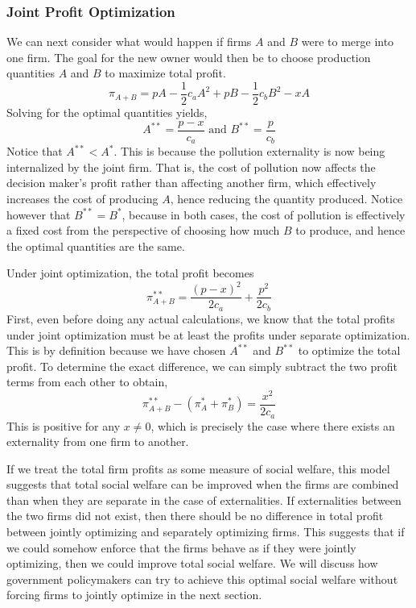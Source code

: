 \subsubsection*{Joint Profit Optimization}
We can next consider what would happen if firms $A$ and $B$ were to merge into one firm. The goal for the new owner would then be to choose production quantities $A$ and $B$ to maximize total profit.
\begin{equation*}
    \pi_{A + B} = pA - \frac{1}{2} c_a A^2 + pB - \frac{1}{2} c_b B^2 - xA
\end{equation*}
Solving for the optimal quantities yields,
\begin{equation*}
    A^{**} = \frac{p - x}{c_a} \text{ and } B^{**} = \frac{p}{c_b}
\end{equation*}
Notice that $A^{**} < A^*$. This is because the pollution externality is now being internalized by the joint firm. That is, the cost of pollution now affects the decision maker's profit rather than affecting another firm, which effectively increases the cost of producing $A$, hence reducing the quantity produced. Notice however that $B^{**} = B^*$, because in both cases, the cost of pollution is effectively a fixed cost from the perspective of choosing how much $B$ to produce, and hence the optimal quantities are the same. 

Under joint optimization, the total profit becomes
\begin{equation*}
    \pi_{A + B}^{**} = \frac{(p - x)^2}{2 c_a} + \frac{p^2}{2 c_b}
\end{equation*}
First, even before doing any actual calculations, we know that the total profits under joint optimization must be at least the profits under separate optimization. This is by definition because we have chosen $A^{**}$ and $B^{**}$ to optimize the total profit. To determine the exact difference, we can simply subtract the two profit terms from each other to obtain,
\begin{equation*}
    \pi_{A + B}^{**} - (\pi_A^* + \pi_B^*) = \frac{x^2}{2c_a}
\end{equation*}
This is positive for any $x \neq 0$, which is precisely the case where there exists an externality from one firm to another. 

If we treat the total firm profits as some measure of social welfare, this model suggests that total social welfare can be improved when the firms are combined than when they are separate in the case of externalities. If externalities between the two firms did not exist, then there should be no difference in total profit between jointly optimizing and separately optimizing firms. This suggests that if we could somehow enforce that the firms behave as if they were jointly optimizing, then we could improve total social welfare. We will discuss how government policymakers can try to achieve this optimal social welfare without forcing firms to jointly optimize in the next section. 

